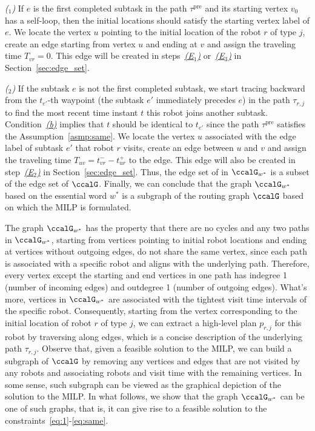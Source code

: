 \documentclass[Afour,sageh,times]{sagej}
\newcounter{mycounter}
\begin{document}
{{{\it ($_1$)} If $e$ is the first completed subtask in the path $\tau^\text{pre}$ and its starting vertex $v_0$ has a self-loop, then the initial locations should satisfy the starting vertex label of $e$. We locate the vertex $u$ pointing to the initial location of the robot $r$ of type $j$, create an edge starting from vertex $u$ and ending at $v$ and assign the traveling time $T_{vr}=0$. This edge will be created in steps~\hyperref[edge:vertex1]{\it (E$_1$)} or~\hyperref[edge:vertex2]{\it (E$_3$)} in Section~\ref{sec:edge_set}.

{\it ($_2$)} If  the subtask $e$ is not the first completed subtask, we start tracing backward from the $t_{e'}$-th waypoint (the subtask $e'$ immediately precedes  $e$) in the path $\tau_{r,j}$ to find the most recent time instant $t$ this robot joins another subtask. Condition~\hyperref[asmp:b]{\it (b)} implies that $t$ should be identical to $t_{e'}$ since the path $\tau^\text{pre}$ satisfies the Assumption~\ref{asmp:same}.  We locate the vertex $u$ associated with the edge label of subtask $e'$ that robot $r$ visits, create an edge between $u$ and $v$ and assign the traveling time $T_{uv} = t_{vr}^- - t_{ur}^+$ to the edge. This edge will also be created in step~\hyperref[edge:vertex2]{\it (E$_2$)} in Section~\ref{sec:edge_set}.  Thus, the edge set of in $\ccalG_{w^*}$ is a subset of the edge set of $\ccalG$. Finally, we can conclude that the graph $\ccalG_{w^*}$ based on the essential word $w^*$ is a subgraph of the routing graph $\ccalG$ based on which the MILP is formulated.


The graph $\ccalG_{w^*}$ has the property that there are no cycles and any two paths in $\ccalG_{w^*}$, starting from vertices pointing to initial robot locations  and ending at vertices without outgoing edges, do not share the same vertex, since each path is associated with a specific robot and aligns with the underlying path. Therefore, every vertex except the starting and end vertices in one path has indegree 1 (number of incoming edges) and outdegree 1 (number of outgoing edges). What's more, vertices in $\ccalG_{w^*}$ are associated with the tightest visit time intervals of the specific robot. Consequently, starting from the vertex corresponding to the initial location of robot $r$ of type $j$, we can extract a high-level plan $p_{r,j}$ for this robot by traversing along edges, which is a concise description of the underlying path $\tau_{r,j}$. Observe that, given a feasible solution to the MILP, we can build a subgraph of $\ccalG$ by removing any vertices and edges that are not visited by any robots and associating robots and visit time with the remaining vertices. In some sense, such subgraph can be viewed as the graphical depiction of the solution to the MILP. In what follows, we show that the graph $\ccalG_{w^*}$ can be one of such graphs, that is, it can give rise to a feasible solution to the constraints~\eqref{eq:1}-\eqref{eq:same}.

}}
\end{document}
